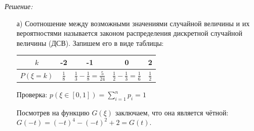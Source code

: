 \noindent\textit{Решение:}

\begin{enumerate}
	\item[а)] Соотношение между возможными значениями случайной величины и их вероятностями называется законом распределения дискретной случайной величины (ДСВ). Запишем его в виде таблицы:
	\begin{table}[H]
		\centering\makegapedcells
		\begin{tabular}{|c|c|c|c|c|}
			\hline
			$k$        & -2            & -1                                         & 0                                     & 2             \\ \hline
			$P(\xi=k)$ & $\frac{1}{8}$ & $\frac{1}{3} - \frac{1}{8} = \frac{5}{24}$ & $\frac{1}{2}-\frac{1}{3}=\frac{1}{6}$ & $\frac{1}{2}$ \\ \hline
		\end{tabular}
	\end{table}
	Проверка: $ p(\xi \in [0,1]) = \sum\limits_{i=1}^{n}p_i = 1$
	
	Посмотрев на функцию $G(\xi)$ заключаем, что она является чётной: $G(-t) = (-t)^4 - (-t)^2 + 2 = G(t)$.
	

\end{enumerate}
